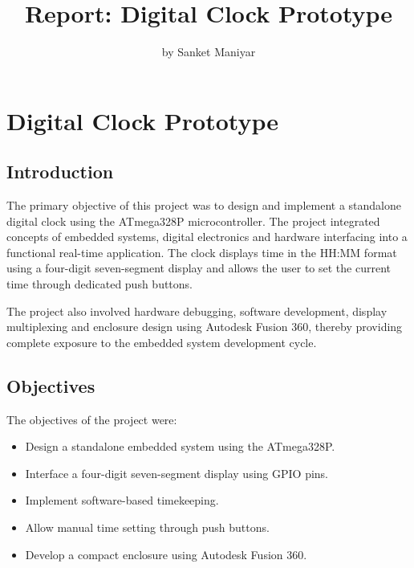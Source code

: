\documentclass[11pt,a4paper]{report}
\title{Report: Digital Clock Prototype}
\author{by Sanket Maniyar}
\date{}
\begin{document}
\maketitle

\tableofcontents

\newpage

\chapter{Digital Clock Prototype}

\section{Introduction}

The primary objective of this project was to design and implement a standalone digital clock using the ATmega328P microcontroller. The project integrated concepts of embedded systems, digital electronics and hardware interfacing into a functional real-time application. The clock displays time in the HH:MM format using a four-digit seven-segment display and allows the user to set the current time through dedicated push buttons.

The project also involved hardware debugging, software development, display multiplexing and enclosure design using Autodesk Fusion 360, thereby providing complete exposure to the embedded system development cycle.


\section{Objectives}

The objectives of the project were:

\begin{itemize}
\item Design a standalone embedded system using the ATmega328P.
\item Interface a four-digit seven-segment display using GPIO pins.
\item Implement software-based timekeeping.
\item Allow manual time setting through push buttons.
\item Develop a compact enclosure using Autodesk Fusion 360.
\end{itemize}

\end{document}
